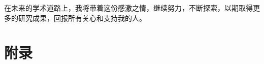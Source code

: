 \documentclass[a4paper,AutoFakeBold,oneside,12pt]{book}
\begin{document}
在未来的学术道路上，我将带着这份感激之情，继续努力，不断探索，以期取得更多的研究成果，回报所有关心和支持我的人。

\setcounter{figure}{0} 
\renewcommand{\thefigure}{~附-\arabic{figure}~}
\setcounter{equation}{0} 
\renewcommand{\theequation}{~附-\arabic{equation}~}
\setcounter{table}{0} 
\renewcommand{\thetable}{~附-\arabic{table}~}
\setcounter{lstlisting}{0} 
\makeatletter
  \renewcommand \thelstlisting
       {附-\@arabic\c@lstlisting}
\makeatother

\chapter*{附\qquad{}录}


\end{document}
